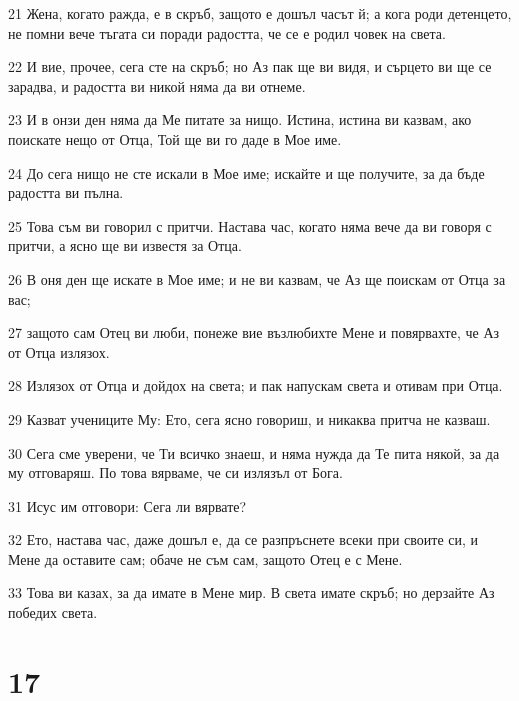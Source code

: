 \par 21 Жена, когато ражда, е в скръб, защото е дошъл часът й; а кога роди детенцето, не помни вече тъгата си поради радостта, че се е родил човек на света.
\par 22 И вие, прочее, сега сте на скръб; но Аз пак ще ви видя, и сърцето ви ще се зарадва, и радостта ви никой няма да ви отнеме.
\par 23 И в онзи ден няма да Ме питате за нищо. Истина, истина ви казвам, ако поискате нещо от Отца, Той ще ви го даде в Мое име.
\par 24 До сега нищо не сте искали в Мое име; искайте и ще получите, за да бъде радостта ви пълна.
\par 25 Това съм ви говорил с притчи. Настава час, когато няма вече да ви говоря с притчи, а ясно ще ви известя за Отца.
\par 26 В оня ден ще искате в Мое име; и не ви казвам, че Аз ще поискам от Отца за вас;
\par 27 защото сам Отец ви люби, понеже вие възлюбихте Мене и повярвахте, че Аз от Отца излязох.
\par 28 Излязох от Отца и дойдох на света; и пак напускам света и отивам при Отца.
\par 29 Казват учениците Му: Ето, сега ясно говориш, и никаква притча не казваш.
\par 30 Сега сме уверени, че Ти всичко знаеш, и няма нужда да Те пита някой, за да му отговаряш. По това вярваме, че си излязъл от Бога.
\par 31 Исус им отговори: Сега ли вярвате?
\par 32 Ето, настава час, даже дошъл е, да се разпръснете всеки при своите си, и Мене да оставите сам; обаче не съм сам, защото Отец е с Мене.
\par 33 Това ви казах, за да имате в Мене мир. В света имате скръб; но дерзайте Аз победих света.

\chapter{17}

